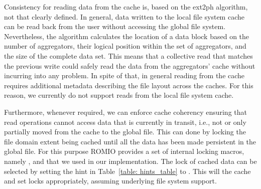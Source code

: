 Consistency for reading data from the cache is, based on the ext2ph algorithm, not that clearly defined. In general, data written to the local file system cache can be read back from the user without accessing the global file system. Nevertheless, the algorithm calculates the location of a data block based on the number of aggregators, their logical position within the set of aggregators, and the size of the complete data set. This means that a collective read that matches the previous write could safely read the data from the aggregators' cache without incurring into any problem. In spite of that, in general reading from the cache requires additional metadata describing the file layout across the caches. For this reason, we currently do not support reads from the local file system cache.


Furthermore, whenever required, we can enforce cache coherency ensuring that read operations cannot access data that is currently in transit, i.e., not or only partially moved from the cache to the global file. This can done by locking the file domain extent being cached until all the data has been made persistent in the global file. For this purpose ROMIO provides a set of internal locking macros, namely ,  and  that we used in our implementation. The lock of cached data can be selected by setting the  hint in Table~\ref{table: hints_table} to . This will  the cache and set locks appropriately, assuming underlying file system support.

